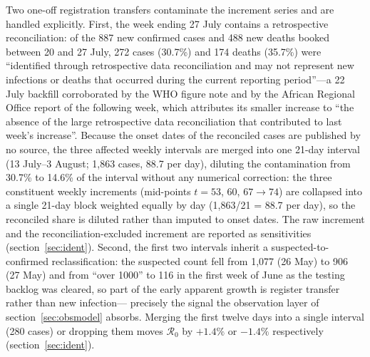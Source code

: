 \documentclass[10pt]{plos}
\newcommand{\Reff}{\mathcal{R}}
\begin{document}
Two one-off registration transfers contaminate the increment series and
are handled explicitly. First, the week ending 27 July contains a
retrospective reconciliation: of the 887 new confirmed cases and 488 new
deaths booked between 20 and 27 July, 272 cases (30.7\%) and 174 deaths
(35.7\%) were ``identified through retrospective data reconciliation and
may not represent new infections or deaths that occurred during the
current reporting period''---a 22 July backfill
corroborated by the WHO figure note  and by the African
Regional Office report of the following week, which attributes its
smaller increase to ``the absence of the large retrospective data
reconciliation that contributed to last week's increase''. Because the onset dates of the reconciled cases are
published by no source, the three affected weekly intervals are merged
into one 21-day interval (13 July--3 August; 1{,}863 cases, 88.7 per
day), diluting the contamination from 30.7\% to 14.6\% of the interval
without any numerical correction: the three constituent weekly increments
(mid-points $t=53$, $60$, $67\to74$) are collapsed into a single
21-day block weighted equally by day (1{,}863/21 = 88.7 per day), so the
reconciled share is diluted rather than imputed to onset dates. The raw
increment and the
reconciliation-excluded increment are reported as sensitivities
(section~\ref{sec:ident}). Second, the first two intervals inherit a
suspected-to-confirmed reclassification: the suspected count fell from
1{,}077 (26 May) to 906 (27 May) and from ``over 1000'' to 116 in the
first week of June as the testing backlog was cleared, so part of the early
apparent growth is register transfer rather than new infection---
precisely the signal the observation layer of
section~\ref{sec:obsmodel} absorbs. Merging the first twelve days into a
single interval (280 cases) or dropping them moves $\Reff_0$ by $+1.4\%$
or $-1.4\%$ respectively (section~\ref{sec:ident}).
\end{document}
